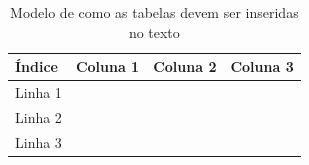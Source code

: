 
\begin{table}[htb]
\caption{Modelo de como as tabelas devem ser inseridas no texto}
\label{tb:exemplo}
\centering
\begin{tabular}{|l|c|r|r|} %
\hline
Índice  & Coluna 1 & Coluna 2 & Coluna 3 \\
\hline
Linha 1 &          &          &          \\
Linha 2 &          &          &          \\
Linha 3 &          &          &          \\
\hline
\end{tabular}
\end{table}
